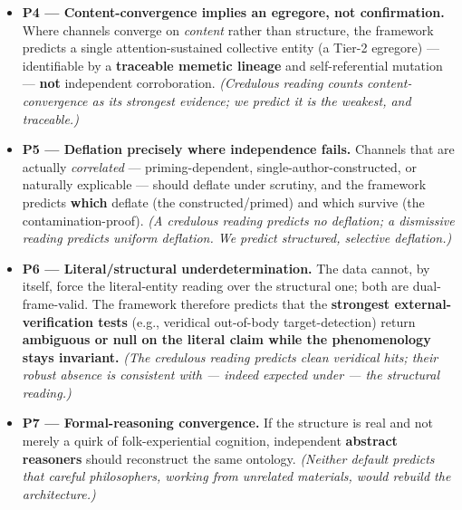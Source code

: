 \documentclass[11pt]{article}
\begin{document}
\begin{itemize}
\item \textbf{P4 --- Content-convergence implies an egregore, not confirmation.} Where channels converge on \emph{content} rather than structure, the framework predicts a single attention-sustained collective entity (a Tier-2 egregore) --- identifiable by a \textbf{traceable memetic lineage} and self-referential mutation --- \textbf{not} independent corroboration. \emph{(Credulous reading counts content-convergence as its strongest evidence; we predict it is the weakest, and traceable.)}
\end{itemize}

\begin{itemize}
\item \textbf{P5 --- Deflation precisely where independence fails.} Channels that are actually \emph{correlated} --- priming-dependent, single-author-constructed, or naturally explicable --- should deflate under scrutiny, and the framework predicts \textbf{which} deflate (the constructed/primed) and which survive (the contamination-proof). \emph{(A credulous reading predicts no deflation; a dismissive reading predicts uniform deflation. We predict structured, selective deflation.)}
\end{itemize}

\begin{itemize}
\item \textbf{P6 --- Literal/structural underdetermination.} The data cannot, by itself, force the literal-entity reading over the structural one; both are dual-frame-valid. The framework therefore predicts that the \textbf{strongest external-verification tests} (e.g., veridical out-of-body target-detection) return \textbf{ambiguous or null on the literal claim while the phenomenology stays invariant.} \emph{(The credulous reading predicts clean veridical hits; their robust absence is consistent with --- indeed expected under --- the structural reading.)}
\end{itemize}

\begin{itemize}
\item \textbf{P7 --- Formal-reasoning convergence.} If the structure is real and not merely a quirk of folk-experiential cognition, independent \textbf{abstract reasoners} should reconstruct the same ontology. \emph{(Neither default predicts that careful philosophers, working from unrelated materials, would rebuild the architecture.)}
\end{itemize}
\end{document}
